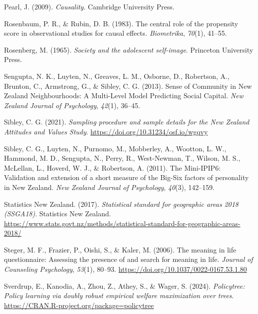 \documentclass[
  single column]{article}
\newlength{\cslhangindent}
\newenvironment{CSLReferences}[2] %
 {\begin{list}{}{%
  \setlength{\itemindent}{0pt}
  \setlength{\leftmargin}{0pt}
  \setlength{\parsep}{0pt}
  \ifodd #1
   \setlength{\leftmargin}{\cslhangindent}
   \setlength{\itemindent}{-1\cslhangindent}
  \fi
  \setlength{\itemsep}{#2\baselineskip}}}
 {\end{list}}
\begin{document}
\begin{CSLReferences}{1}{0}
Pearl, J. (2009). \emph{Causality}. Cambridge University Press.

Rosenbaum, P. R., \& Rubin, D. B. (1983). The central role of the
propensity score in observational studies for causal effects.
\emph{Biometrika}, \emph{70}(1), 41--55.

Rosenberg, M. (1965). \emph{Society and the adolescent self-image}.
Princeton University Press.

Sengupta, N. K., Luyten, N., Greaves, L. M., Osborne, D., Robertson, A.,
Brunton, C., Armstrong, G., \& Sibley, C. G. (2013). Sense of Community
in {N}ew {Z}ealand Neighbourhoods: A Multi-Level Model Predicting Social
Capital. \emph{New Zealand Journal of Psychology}, \emph{42}(1), 36--45.

Sibley, C. G. (2021). \emph{Sampling procedure and sample details for
the {N}ew {Z}ealand {A}ttitudes and {V}alues {S}tudy}.
\url{https://doi.org/10.31234/osf.io/wgqvy}

Sibley, C. G., Luyten, N., Purnomo, M., Mobberley, A., Wootton, L. W.,
Hammond, M. D., Sengupta, N., Perry, R., West-Newman, T., Wilson, M. S.,
McLellan, L., Hoverd, W. J., \& Robertson, A. (2011). The Mini-IPIP6:
Validation and extension of a short measure of the Big-Six factors of
personality in {N}ew {Z}ealand. \emph{New Zealand Journal of
Psychology}, \emph{40}(3), 142--159.

Statistics New Zealand. (2017). \emph{Statistical standard for
geographic areas 2018 (SSGA18)}. Statistics New Zealand.
\url{https://www.stats.govt.nz/methods/statistical-standard-for-geographic-areas-2018/}

Steger, M. F., Frazier, P., Oishi, S., \& Kaler, M. (2006). The meaning
in life questionnaire: Assessing the presence of and search for meaning
in life. \emph{Journal of Counseling Psychology}, \emph{53}(1), 80--93.
\url{https://doi.org/10.1037/0022-0167.53.1.80}

Sverdrup, E., Kanodia, A., Zhou, Z., Athey, S., \& Wager, S. (2024).
\emph{Policytree: Policy learning via doubly robust empirical welfare
maximization over trees}.
\url{https://CRAN.R-project.org/package=policytree}


\end{CSLReferences}
\end{document}
